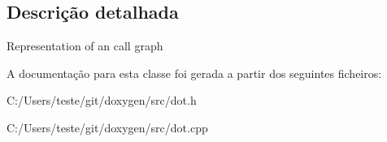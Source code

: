 \subsection{Descrição detalhada}
Representation of an call graph 

A documentação para esta classe foi gerada a partir dos seguintes ficheiros\-:\begin{DoxyCompactItemize}
\item 
C\-:/\-Users/teste/git/doxygen/src/dot.\-h\item 
C\-:/\-Users/teste/git/doxygen/src/dot.\-cpp\end{DoxyCompactItemize}
